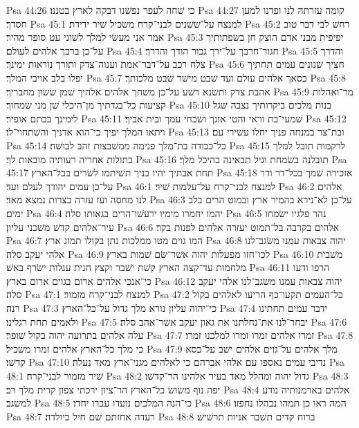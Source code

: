 Psa 44:26  כי שׁחה לעפר נפשׁנו דבקה לארץ בטננו׃
Psa 44:27  קומה עזרתה לנו ופדנו למען חסדך׃
Psa 45:1  למנצח על־שׁשׁנים לבני־קרח משׂכיל שׁיר ידידת׃
Psa 45:2  רחשׁ לבי דבר טוב אמר אני מעשׂי למלך לשׁוני עט סופר מהיר׃
Psa 45:3  יפיפית מבני אדם הוצק חן בשׂפתותיך על־כן ברכך אלהים לעולם׃
Psa 45:4  חגור־חרבך על־ירך גבור הודך והדרך׃
Psa 45:5  והדרך צלח רכב על־דבר־אמת וענוה־צדק ותורך נוראות ימינך׃
Psa 45:6  חציך שׁנונים עמים תחתיך יפלו בלב אויבי המלך׃
Psa 45:7  כסאך אלהים עולם ועד שׁבט מישׁר שׁבט מלכותך׃
Psa 45:8  אהבת צדק ותשׂנא רשׁע על־כן משׁחך אלהים אלהיך שׁמן שׂשׂון מחבריך׃
Psa 45:9  מר־ואהלות קציעות כל־בגדתיך מן־היכלי שׁן מני שׂמחוך׃
Psa 45:10  בנות מלכים ביקרותיך נצבה שׁגל לימינך בכתם אופיר׃
Psa 45:11  שׁמעי־בת וראי והטי אזנך ושׁכחי עמך ובית אביך׃
Psa 45:12  ויתאו המלך יפיך כי־הוא אדניך והשׁתחוי־לו׃
Psa 45:13  ובת־צר במנחה פניך יחלו עשׁירי עם׃
Psa 45:14  כל־כבודה בת־מלך פנימה ממשׁבצות זהב לבושׁה׃
Psa 45:15  לרקמות תובל למלך בתולות אחריה רעותיה מובאות לך׃
Psa 45:16  תובלנה בשׂמחת וגיל תבאינה בהיכל מלך׃
Psa 45:17  תחת אבתיך יהיו בניך תשׁיתמו לשׂרים בכל־הארץ׃
Psa 45:18  אזכירה שׁמך בכל־דר ודר על־כן עמים יהודך לעלם ועד׃
Psa 46:1  למנצח לבני־קרח על־עלמות שׁיר׃
Psa 46:2  אלהים לנו מחסה ועז עזרה בצרות נמצא מאד׃
Psa 46:3  על־כן לא־נירא בהמיר ארץ ובמוט הרים בלב ימים׃
Psa 46:4  יהמו יחמרו מימיו ירעשׁו־הרים בגאותו סלה׃
Psa 46:5  נהר פלגיו ישׂמחו עיר־אלהים קדשׁ משׁכני עליון׃
Psa 46:6  אלהים בקרבה בל־תמוט יעזרה אלהים לפנות בקר׃
Psa 46:7  המו גוים מטו ממלכות נתן בקולו תמוג ארץ׃
Psa 46:8  יהוה צבאות עמנו משׂגב־לנו אלהי יעקב סלה׃
Psa 46:9  לכו־חזו מפעלות יהוה אשׁר־שׂם שׁמות בארץ׃
Psa 46:10  משׁבית מלחמות עד־קצה הארץ קשׁת ישׁבר וקצץ חנית עגלות ישׂרף באשׁ׃
Psa 46:11  הרפו ודעו כי־אנכי אלהים ארום בגוים ארום בארץ׃
Psa 46:12  יהוה צבאות עמנו משׂגב־לנו אלהי יעקב סלה׃
Psa 47:1  למנצח לבני־קרח מזמור׃
Psa 47:2  כל־העמים תקעו־כף הריעו לאלהים בקול רנה׃
Psa 47:3  כי־יהוה עליון נורא מלך גדול על־כל־הארץ׃
Psa 47:4  ידבר עמים תחתינו ולאמים תחת רגלינו׃
Psa 47:5  יבחר־לנו את־נחלתנו את גאון יעקב אשׁר־אהב סלה׃
Psa 47:6  עלה אלהים בתרועה יהוה בקול שׁופר׃
Psa 47:7  זמרו אלהים זמרו זמרו למלכנו זמרו׃
Psa 47:8  כי מלך כל־הארץ אלהים זמרו משׂכיל׃
Psa 47:9  מלך אלהים על־גוים אלהים ישׁב על־כסא קדשׁו׃
Psa 47:10  נדיבי עמים נאספו עם אלהי אברהם כי לאלהים מגני־ארץ מאד נעלה׃
Psa 48:1  שׁיר מזמור לבני־קרח׃
Psa 48:2  גדול יהוה ומהלל מאד בעיר אלהינו הר־קדשׁו׃
Psa 48:3  יפה נוף משׂושׂ כל־הארץ הר־ציון ירכתי צפון קרית מלך רב׃
Psa 48:4  אלהים בארמנותיה נודע למשׂגב׃
Psa 48:5  כי־הנה המלכים נועדו עברו יחדו׃
Psa 48:6  המה ראו כן תמהו נבהלו נחפזו׃
Psa 48:7  רעדה אחזתם שׁם חיל כיולדה׃
Psa 48:8  ברוח קדים תשׁבר אניות תרשׁישׁ׃
